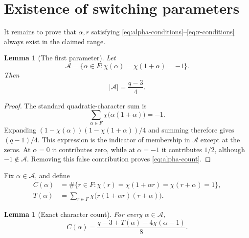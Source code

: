 \documentclass[11pt]{article}
\newtheorem{lemma}[theorem]{Lemma}
\theoremstyle{definition}
\theoremstyle{remark}
\newcommand{\calA}{\mathcal A}
\begin{document}
\section{Existence of switching parameters}
It remains to prove that \(\alpha,r\) satisfying
\eqref{eq:alpha-conditions}--\eqref{eq:r-conditions} always exist in the
claimed range.

\begin{lemma}[The first parameter]
\label{lem:alpha-count}
Let
\[
 \calA=\{\alpha\in F:\chi(\alpha)=\chi(1+\alpha)=-1\}.
\]
Then
\begin{equation}
 |\calA|=\frac{q-3}{4}.
 \label{eq:alpha-count}
\end{equation}
\end{lemma}

\begin{proof}
The standard quadratic-character sum is
\[
 \sum_{\alpha\in F}\chi\bigl(\alpha(1+\alpha)\bigr)=-1.
\]
Expanding
\((1-\chi(\alpha))(1-\chi(1+\alpha))/4\) and summing therefore gives
\((q-1)/4\).  This expression is the indicator of membership in \(\calA\)
except at the zeros.  At \(\alpha=0\) it contributes zero, while at
\(\alpha=-1\) it contributes \(1/2\), although \(-1\notin\calA\).  Removing
this false contribution proves \eqref{eq:alpha-count}.
\end{proof}

Fix \(\alpha\in\calA\), and define
\begin{align}
 C(\alpha)
 &=\#\{r\in F:\chi(r)=\chi(1+\alpha r)=\chi(r+\alpha)=1\},
 \label{eq:C-definition}\\
 T(\alpha)
 &=\sum_{r\in F}\chi\bigl(r(1+\alpha r)(r+\alpha)\bigr).
 \label{eq:T-definition}
\end{align}

\begin{lemma}[Exact character count]
\label{lem:character-count}
For every \(\alpha\in\calA\),
\begin{equation}
 C(\alpha)=
 \frac{q-3+T(\alpha)-4\chi(\alpha-1)}{8}.
 \label{eq:exact-character-count}
\end{equation}
\end{lemma}
\end{document}

